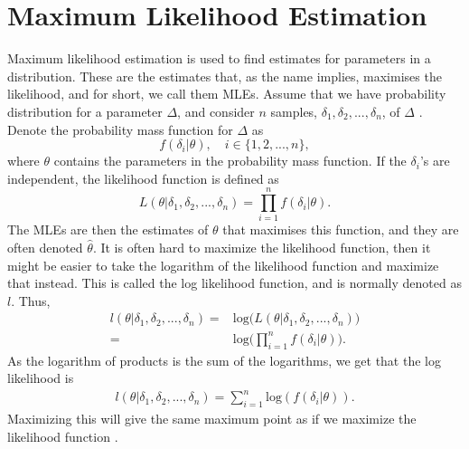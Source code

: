 \section{Maximum Likelihood Estimation}
\label{section_theory_mle}

Maximum likelihood estimation is used to find estimates for parameters in a distribution. These are the estimates that, as the name implies, maximises the likelihood, and for short, we call them MLEs. Assume that we have probability distribution for a parameter $\Delta$, and consider $n$ samples, $\delta_1,\delta_2,...,\delta_n$, of $\Delta$ . Denote the probability mass function for $\Delta$ as
\begin{equation*}
    f(\delta_i|\theta), \quad i \in \{1,2,...,n\},
\end{equation*}
where $\theta$ contains the parameters in the probability mass function. If the $\delta_i$'s are independent, the likelihood function is defined as
\begin{equation}
\label{likelihood}
    L(\theta|\delta_1,\delta_2,...,\delta_n) =  \prod_{i=1}^{n} f(\delta_i|\theta).
\end{equation} 
The MLEs are then the estimates of $\theta$ that maximises this function, and they are often denoted $\hat{\theta}$. It is often hard to maximize the likelihood function, then it might be easier to take the logarithm of the likelihood function and maximize that instead. This is called the log likelihood function, and is normally denoted as $l$. Thus,
\begin{equation}
\label{chap2:log_likelihood}
    \begin{aligned}
        l(\theta|\delta_1,\delta_2,...,\delta_n) 
        =& \text{log}\big(L(\theta|\delta_1,\delta_2,...,\delta_n)\big)\\
        =& \text{log}\big(\prod_{i=1}^{n} f(\delta_i|\theta) \big).
    \end{aligned}
\end{equation}
As the logarithm of products is the sum of the logarithms, we get that the log likelihood is
\begin{equation}
\label{chap2:log_likelihood2}
    \begin{aligned}
        l(\theta|\delta_1,\delta_2,...,\delta_n) = \sum_{i=1}^n \text{log}(f(\delta_i|\theta)).
    \end{aligned}
\end{equation}
Maximizing this will give the same maximum point as if we maximize the likelihood function \citep{statinf}. 

